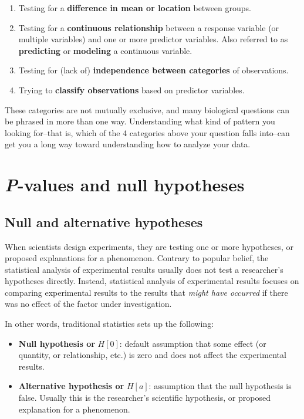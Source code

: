 \documentclass[
  13,
  letterpaper,
]{report}
\begin{document}
\begin{enumerate}
\def\labelenumi{\arabic{enumi}.}
\item
  Testing for a \textbf{difference in mean or location} between groups.
\item
  Testing for a \textbf{continuous relationship} between a response
  variable (or multiple variables) and one or more predictor variables.
  Also referred to as \textbf{predicting} or \textbf{modeling} a
  continuous variable.
\item
  Testing for (lack of) \textbf{independence between categories} of
  observations.
\item
  Trying to \textbf{classify observations} based on predictor variables.
\end{enumerate}

These categories are not mutually exclusive, and many biological
questions can be phrased in more than one way. Understanding what kind
of pattern you looking for--that is, which of the 4 categories above
your question falls into--can get you a long way toward understanding
how to analyze your data.

\section{\texorpdfstring{\emph{P}-values and null
hypotheses}{P-values and null hypotheses}}\label{sec-intro-pvals}

\subsection{Null and alternative hypotheses}\label{sec-intro-pvals-null}

When scientists design experiments, they are testing one or more
hypotheses, or proposed explanations for a phenomenon. Contrary to
popular belief, the statistical analysis of experimental results usually
does not test a researcher's hypotheses directly. Instead, statistical
analysis of experimental results focuses on comparing experimental
results to the results that \emph{might have occurred} if there was no
effect of the factor under investigation.

In other words, traditional statistics sets up the following:

\begin{itemize}
\item
  \textbf{Null hypothesis or} \(H[0]\): default assumption that some
  effect (or quantity, or relationship, etc.) is zero and does not
  affect the experimental results.
\item
  \textbf{Alternative hypothesis or} \(H[a]\): assumption that the null
  hypothesis is false. Usually this is the researcher's scientific
  hypothesis, or proposed explanation for a phenomenon.
\end{itemize}
\end{document}
